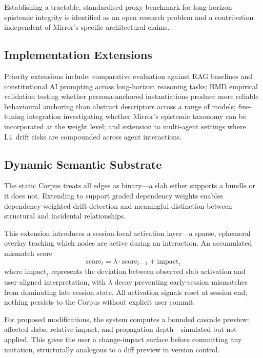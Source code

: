 \documentclass[11pt,a4paper]{article}
\begin{document}
Establishing a tractable, standardised proxy benchmark for long-horizon epistemic integrity is identified as an open research problem and a contribution independent of Mirror's specific architectural claims.

\subsection{Implementation Extensions}

Priority extensions include: comparative evaluation against RAG baselines and constitutional AI prompting across long-horizon reasoning tasks; BMD empirical validation testing whether persona-anchored instantiations produce more reliable behavioural anchoring than abstract descriptors across a range of models; fine-tuning integration investigating whether Mirror's epistemic taxonomy can be incorporated at the weight level; and extension to multi-agent settings where L4~drift risks are compounded across agent interactions.

\subsection{Dynamic Semantic Substrate}

The static Corpus treats all edges as binary---a slab either supports a bundle or it does not.
Extending to support graded dependency weights enables dependency-weighted drift detection and meaningful distinction between structural and incidental relationships.

This extension introduces a session-local activation layer---a sparse, ephemeral overlay tracking which nodes are active during an interaction.
An accumulated mismatch score
\begin{equation}
    \text{score}_t = \lambda \cdot \text{score}_{t-1} + \text{impact}_t
\end{equation}
where $\text{impact}_t$ represents the deviation between observed slab activation and user-aligned interpretation, with $\lambda$ decay preventing early-session mismatches from dominating late-session state.
All activation signals reset at session end; nothing persists to the Corpus without explicit user commit.

For proposed modifications, the system computes a bounded cascade preview: affected slabs, relative impact, and propagation depth---simulated but not applied.
This gives the user a change-impact surface before committing any mutation, structurally analogous to a diff preview in version control.
\end{document}
